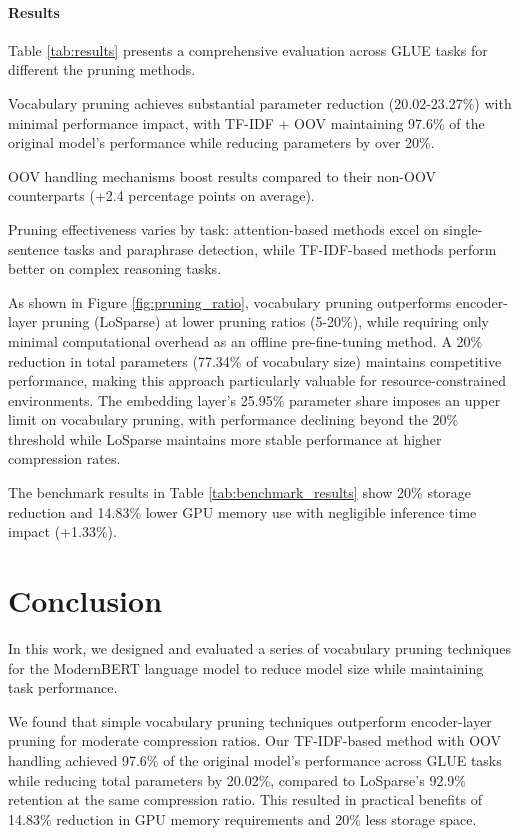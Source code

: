 \documentclass[twocolumn]{article}
\begin{document}
\paragraph{Results}
Table \ref{tab:results} presents a comprehensive evaluation across GLUE tasks for different the pruning methods. 

Vocabulary pruning achieves substantial parameter reduction (20.02-23.27\%) with minimal performance impact, with TF-IDF + OOV maintaining 97.6\% of the original model's performance while reducing parameters by over 20\%. 

OOV handling mechanisms boost results compared to their non-OOV counterparts (+2.4 percentage points on average). 

Pruning effectiveness varies by task: attention-based methods excel on single-sentence tasks and paraphrase detection, while TF-IDF-based methods perform better on complex reasoning tasks. 

As shown in Figure \ref{fig:pruning_ratio}, vocabulary pruning outperforms encoder-layer pruning (LoSparse) at lower pruning ratios (5-20\%), while requiring only minimal computational overhead as an offline pre-fine-tuning method. A 20\% reduction in total parameters (77.34\% of vocabulary size) maintains competitive performance, making this approach particularly valuable for resource-constrained environments. The embedding layer's 25.95\% parameter share imposes an upper limit on vocabulary pruning, with performance declining beyond the 20\% threshold while LoSparse maintains more stable performance at higher compression rates. 

The benchmark results in Table \ref{tab:benchmark_results} show 20\% storage reduction and 14.83\% lower GPU memory use with negligible inference time impact (+1.33\%).


\section{Conclusion}
In this work, we designed and evaluated a series of vocabulary pruning techniques for the ModernBERT language model to reduce model size while maintaining task performance.

We found that simple vocabulary pruning techniques outperform encoder-layer pruning for moderate compression ratios. Our TF-IDF-based method with OOV handling achieved 97.6\% of the original model's performance across GLUE tasks while reducing total parameters by 20.02\%, compared to LoSparse's 92.9\% retention at the same compression ratio. This resulted in practical benefits of 14.83\% reduction in GPU memory requirements and 20\% less storage space.
\end{document}
